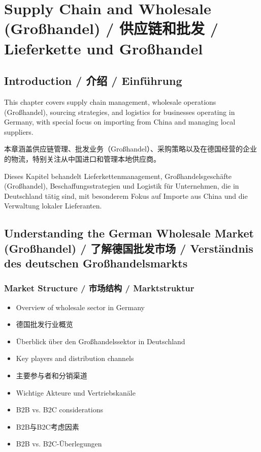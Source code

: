 \chapter{Supply Chain and Wholesale (Großhandel) / 供应链和批发 / Lieferkette und Großhandel}

\section{Introduction / 介绍 / Einführung}

This chapter covers supply chain management, wholesale operations (Großhandel), sourcing strategies, and logistics for businesses operating in Germany, with special focus on importing from China and managing local suppliers.

本章涵盖供应链管理、批发业务（Großhandel）、采购策略以及在德国经营的企业的物流，特别关注从中国进口和管理本地供应商。

Dieses Kapitel behandelt Lieferkettenmanagement, Großhandelsgeschäfte (Großhandel), Beschaffungsstrategien und Logistik für Unternehmen, die in Deutschland tätig sind, mit besonderem Fokus auf Importe aus China und die Verwaltung lokaler Lieferanten.

\section{Understanding the German Wholesale Market (Großhandel) / 了解德国批发市场 / Verständnis des deutschen Großhandelsmarkts}

\subsection{Market Structure / 市场结构 / Marktstruktur}
\begin{itemize}
    \item Overview of wholesale sector in Germany
    \item 德国批发行业概览
    \item Überblick über den Großhandelssektor in Deutschland
    \item Key players and distribution channels
    \item 主要参与者和分销渠道
    \item Wichtige Akteure und Vertriebskanäle
    \item B2B vs. B2C considerations
    \item B2B与B2C考虑因素
    \item B2B vs. B2C-Überlegungen
\end{itemize}


